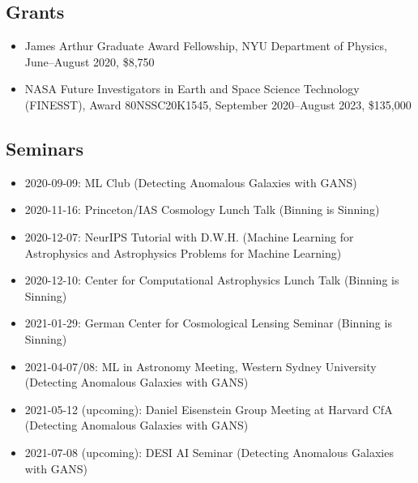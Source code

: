 \documentclass{article}
\begin{document}
\subsection{Grants}
\label{sec:grants}

\begin{itemize}
\item James Arthur Graduate Award Fellowship, NYU Department of Physics, June--August 2020, \$8,750
\item NASA Future Investigators in Earth and Space Science Technology (FINESST), Award 80NSSC20K1545, September 2020--August 2023, \$135,000
\end{itemize}

\subsection{Seminars}
\label{sec:seminars}

\begin{itemize}
\item 2020-09-09: ML Club (Detecting Anomalous Galaxies with GANS)
\item 2020-11-16: Princeton/IAS Cosmology Lunch Talk (Binning is Sinning)
\item 2020-12-07: NeurIPS Tutorial with D.W.H. (Machine Learning for Astrophysics and Astrophysics Problems for Machine Learning)
\item 2020-12-10: Center for Computational Astrophysics Lunch Talk (Binning is Sinning)
\item 2021-01-29: German Center for Cosmological Lensing Seminar (Binning is Sinning)
\item 2021-04-07/08: ML in Astronomy Meeting, Western Sydney University (Detecting Anomalous Galaxies with GANS)
\item 2021-05-12 (upcoming): Daniel Eisenstein Group Meeting at Harvard CfA (Detecting Anomalous Galaxies with GANS)
\item 2021-07-08 (upcoming): DESI AI Seminar (Detecting Anomalous Galaxies with GANS)
\end{itemize}
\end{document}
